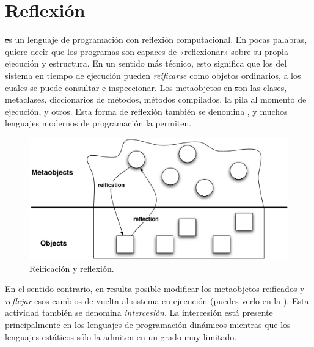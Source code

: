 \documentclass[a4paper,10pt,twoside]{book}
\begin{document}
        \sloppy
\fi

\chapter{Reflexi\'on}

\st es un lenguaje de programaci\'on con reflexi\'on computacional.
En pocas palabras, quiere decir que los programas son capaces de
«reflexionar» sobre su propia ejecuci\'on y estructura.
En un sentido m\'as t\'ecnico, esto significa que
los  del sistema en tiempo de ejecuci\'on
pueden \emph{reificarse} como objetos ordinarios, a los cuales se
puede consultar e inspeccionar.  Los metaobjetos en \st son las
clases, metaclases, diccionarios de m\'etodos, m\'etodos compilados, la
pila al momento de ejecuci\'on, y otros.  Esta forma de reflexi\'on
tambi\'en se denomina , y muchos lenguajes
modernos de programaci\'on la permiten.

\begin{figure}[ht]\centering
        \includegraphics[width=\linewidth]{reflect}
        \caption{Reificaci\'on y reflexi\'on.} %
\end{figure}

En el sentido contrario, en \st resulta posible modificar los
metaobjetos reificados y \emph{reflejar} esos cambios de vuelta al
sistema en ejecuci\'on (puedes verlo en la ).  Esta
actividad tambi\'en se denomina \emph{intercesi\'on}. La intercesi\'on est\'a
presente principalmente en los lenguajes de programaci\'on din\'amicos
mientras que los lenguajes est\'aticos s\'olo la admiten en un grado muy
limitado.
\end{document}
